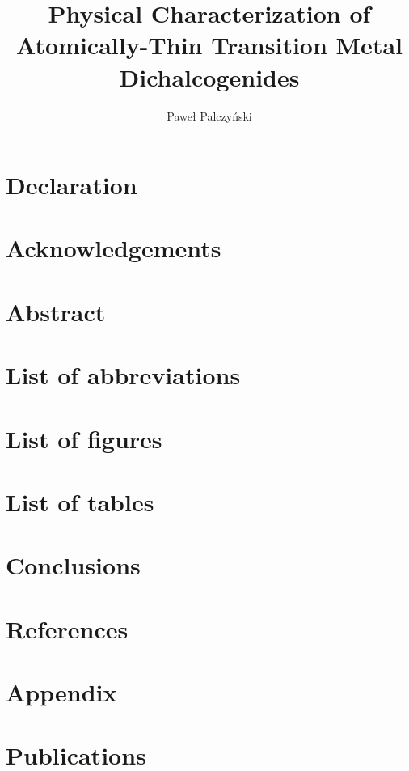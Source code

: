 \documentclass[12pt, a4paper]{article}
\author{Paweł Palczyński}
\begin{document}
\tableofcontents

\title{Physical Characterization of Atomically-Thin Transition Metal Dichalcogenides}

\maketitle

\section*{Declaration}
\section*{Acknowledgements}
\section*{Abstract}
\section*{List of abbreviations}
\section*{List of figures}
\section*{List of tables}


	\label{sec:Introduction}









\section{Conclusions}
	
\section*{References}
\section*{Appendix}

\section*{Publications}
\end{document}
